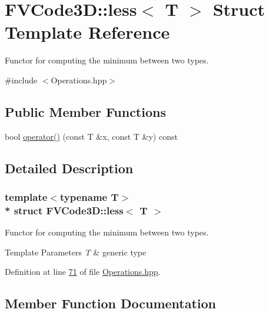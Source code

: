 \hypertarget{structFVCode3D_1_1less}{}\section{F\+V\+Code3D\+:\+:less$<$ T $>$ Struct Template Reference}
\label{structFVCode3D_1_1less}


Functor for computing the minimum between two types.  




{\ttfamily \#include $<$Operations.\+hpp$>$}

\subsection*{Public Member Functions}
\begin{DoxyCompactItemize}
\item 
bool \hyperlink{structFVCode3D_1_1less_ab84f15efe248c8504788d3b627df7330}{operator()} (const T \&x, const T \&y) const 
\end{DoxyCompactItemize}


\subsection{Detailed Description}
\subsubsection*{template$<$typename T$>$\\*
struct F\+V\+Code3\+D\+::less$<$ T $>$}

Functor for computing the minimum between two types. 


\begin{DoxyTemplParams}{Template Parameters}
{\em T} & generic type \\
\hline
\end{DoxyTemplParams}


Definition at line \hyperlink{Operations_8hpp_source_l00071}{71} of file \hyperlink{Operations_8hpp_source}{Operations.\+hpp}.



\subsection{Member Function Documentation}
